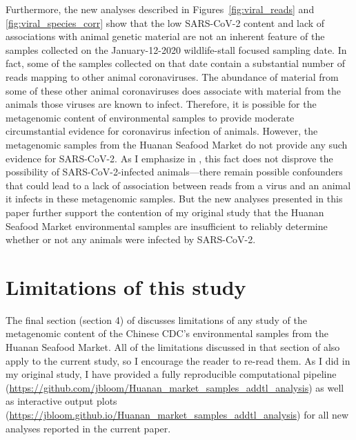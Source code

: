 \documentclass[9pt,twocolumn,twoside]{gsajnl_modified}
\begin{document}
Furthermore, the new analyses described in Figures~\ref{fig:viral_reads} and \ref{fig:viral_species_corr} show that the low SARS-CoV-2 content and lack of associations with animal genetic material are not an inherent feature of the samples collected on the January-12-2020 wildlife-stall focused sampling date.
In fact, some of the samples collected on that date contain a substantial number of reads mapping to other animal coronaviruses.
The abundance of material from some of these other animal coronaviruses does associate with material from the animals those viruses are known to infect.
Therefore, it is possible for the metagenomic content of environmental samples to provide moderate circumstantial evidence for coronavirus infection of animals.
However, the metagenomic samples from the Huanan Seafood Market do not provide any such evidence for SARS-CoV-2.
As I emphasize in \citet{bloom2023association}, this fact does not disprove the possibility of SARS-CoV-2-infected animals---there remain possible confounders that could lead to a lack of association between reads from a virus and an animal it infects in these metagenomic samples.
But the new analyses presented in this paper further support the contention of my original study that the Huanan Seafood Market environmental samples are insufficient to reliably determine whether or not any animals were infected by SARS-CoV-2.

\section{Limitations of this study}
The final section (section 4) of \citet{bloom2023association} discusses limitations of any study of the metagenomic content of the Chinese CDC's environmental samples from the Huanan Seafood Market.
All of the limitations discussed in that section of \citet{bloom2023association} also apply to the current study, so I encourage the reader to re-read them.
As I did in my original study, I have provided a fully reproducible computational pipeline (\url{https://github.com/jbloom/Huanan_market_samples_addtl_analysis}) as well as interactive output plots (\url{https://jbloom.github.io/Huanan_market_samples_addtl_analysis}) for all new analyses reported in the current paper.
\end{document}
